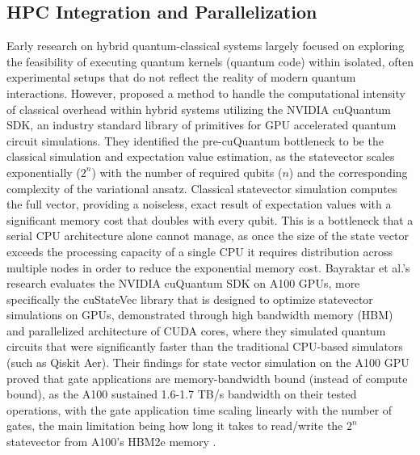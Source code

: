 \subsection{HPC Integration and Parallelization} 
Early research on hybrid quantum-classical systems largely focused on exploring the feasibility of executing quantum kernels (quantum code)
within isolated, often experimental setups that do not reflect the reality of modern quantum interactions. 
However, \textcite{bayraktar2023cuquantum} proposed a method to handle the computational intensity of classical overhead 
within hybrid systems utilizing the NVIDIA cuQuantum SDK, an industry standard library of primitives for GPU accelerated quantum circuit simulations. 
They identified the pre-cuQuantum bottleneck to be the classical simulation and expectation value estimation, as the statevector scales exponentially ($2^n$) with the number 
of required qubits ($n$) and the corresponding complexity of the variational ansatz. Classical statevector simulation computes 
the full vector, providing a noiseless, exact result of expectation values with a significant memory cost that doubles with every qubit. This is a bottleneck that a serial 
CPU architecture alone cannot manage, as once the size of the state vector exceeds the processing capacity of a single CPU 
it requires distribution across multiple nodes in order to reduce the exponential memory cost.  
Bayraktar et al.'s research evaluates the NVIDIA cuQuantum SDK on A100 GPUs, more specifically the 
cuStateVec library that is designed to optimize statevector simulations on GPUs, demonstrated through high bandwidth memory (HBM) 
and parallelized architecture of CUDA cores, where they simulated quantum circuits that were significantly faster than 
the traditional CPU-based simulators (such as Qiskit Aer). Their findings for state vector simulation on the 
A100 GPU proved that gate applications are memory-bandwidth bound (instead of compute bound), 
as the A100 sustained 1.6-1.7 TB/s bandwidth on their tested operations, with the gate application time scaling linearly
with the number of gates, the main limitation being how long it takes to read/write the $2^n$ statevector from A100's HBM2e memory \parencite{bayraktar2023cuquantum}. 

